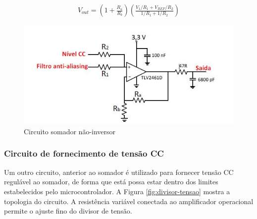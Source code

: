 \begin{align}
	V_{out} = \left(1+\frac{R_a}{R_b}\right)\left(\frac{V_1/R_1 + V_{REF}/R_2}{1/R_1 + 1/R_2}\right)\label{eq:circuito-somador}
\end{align}

\begin{figure}[!hbt]
	\begin{center}
		\includegraphics[scale=0.7]{figuras/somador-ninversor.JPG}
		\caption{Circuito somador não-inversor}
		\label{fig:somador-ninversor}
	\end{center}
\end{figure}

\subsubsection{Circuito de fornecimento de tensão CC}

Um outro circuito, anterior ao somador é utilizado para fornecer tensão CC regulável ao somador, de forma que está possa estar dentro dos limites estabelecidos pelo microcontrolador. A Figura \ref{fig:divisor-tensao} mostra a topologia do circuito. A resistência variável conectada ao amplificador operacional permite o ajuste fino do divisor de tensão.

